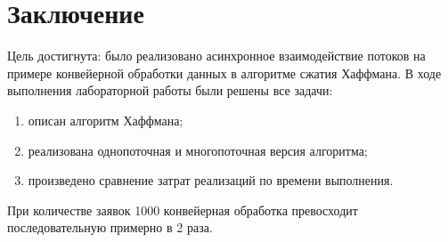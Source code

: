 \chapter*{Заключение}

Цель достигнута: было реализовано асинхронное взаимодействие потоков на примере конвейерной обработки данных в алгоритме сжатия Хаффмана.
В ходе выполнения лабораторной работы были решены все задачи:
\begin{enumerate}
	\item описан алгоритм Хаффмана;
	\item реализована однопоточная и многопоточная версия алгоритма;
	\item произведено сравнение затрат реализаций по времени выполнения.
\end{enumerate}

При количестве заявок 1000 конвейерная обработка превосходит последовательную примерно в 2 раза.



